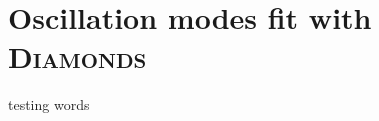 \appendix
\section{Oscillation modes fit with \textsc{D\large{iamonds}}}
\label{appendix}

testing
words